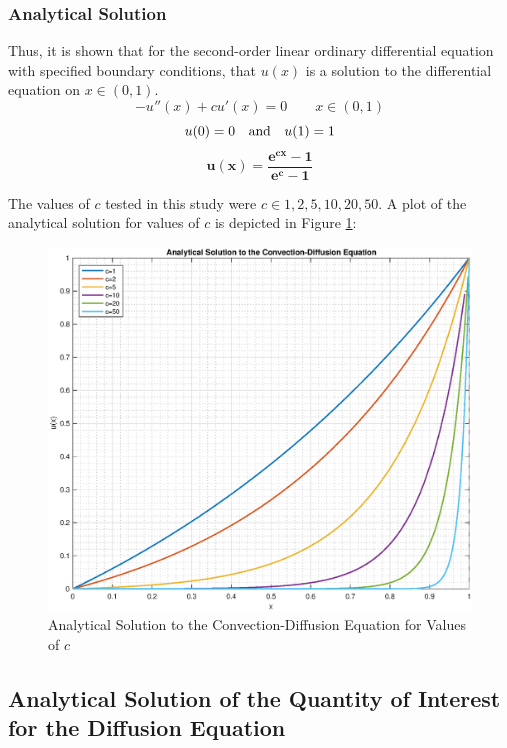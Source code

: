 \documentclass[10pt]{article}		%
\numberwithin{equation}{section}
\begin{document}
\subsubsection{Analytical Solution}

Thus, it is shown that for the second-order linear ordinary differential equation with specified boundary conditions, that $u(x)$ is a solution to the differential equation on $x \in (0, 1)$.
\begin{equation}
-u''(x)+cu'(x)=0 \qquad x \in (0, 1)
\end{equation}
\begin{equation}
u(0) = 0 \quad \textnormal{and} \quad u(1) = 1 
\end{equation}
\begin{equation}
\mathbf{u(x) = \frac{e^{cx}-1}{e^c-1}}
\end{equation}

The values of $c$ tested in this study were $c \in {1, 2, 5, 10, 20, 50}$. A plot of the analytical solution for values of $c$ is depicted in Figure \ref{fig:analytical_conv_diff}:
\begin{figure}[H]
	\begin{center}
		\includegraphics[width = 0.9\linewidth]{analytical_solution_convection_diffusion}
		\caption{Analytical Solution to the Convection-Diffusion Equation for Values of $c$}
		\label{fig:analytical_conv_diff}
	\end{center}
\end{figure}

\newpage

\subsection{Analytical Solution of the Quantity of Interest for the Diffusion Equation}
\end{document}
